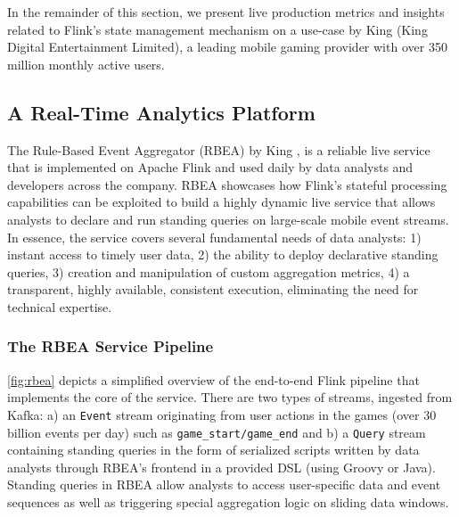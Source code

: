 In the remainder of this section, we present live production metrics and insights related to Flink's state management mechanism on a use-case by King (King Digital Entertainment Limited), a leading mobile gaming provider with over 350 million monthly active users.

\subsection{A Real-Time Analytics Platform}

The Rule-Based Event Aggregator (RBEA) by King \cite{CUSTOM:web/kingrbea}, is a reliable live service that is implemented on Apache Flink and used daily by data analysts and developers across the company. RBEA showcases how Flink's stateful processing capabilities can be exploited to build a highly dynamic live service that allows analysts to declare and run standing queries on large-scale mobile event streams. In essence, the service covers several fundamental needs of data analysts: 1) instant access to timely user data, 2) the ability to deploy declarative standing queries, 3) creation and manipulation of custom aggregation metrics, 4) a transparent, highly available, consistent execution, eliminating the need for technical expertise.

\subsubsection{The RBEA Service Pipeline}
\autoref{fig:rbea} depicts a simplified overview of the end-to-end Flink pipeline that implements the core of the service. There are two types of streams, ingested from Kafka: a) an \texttt{Event} stream originating from  user actions in the games (over 30 billion events per day) such as \texttt{game\_start/game\_end} and b) a \texttt{Query} stream containing standing queries in the form of serialized scripts written by data analysts through RBEA's frontend in a provided DSL (using Groovy or Java). Standing queries in RBEA allow analysts to access user-specific data and event sequences as well as triggering special aggregation logic on sliding data windows. %

